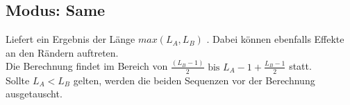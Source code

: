 \subsection{Modus: Same}
Liefert ein Ergebnis der Länge $ max(L_A, L_B) $ . Dabei können ebenfalls Effekte an den Rändern auftreten.\\
Die Berechnung findet im Bereich von $ \frac{(L_B - 1)}{2} \text{ bis } L_A - 1 + \frac{L_B - 1}{2} $ statt. \\
Sollte $ L_A < L_B $ gelten, werden die beiden Sequenzen vor der Berechnung ausgetauscht.










